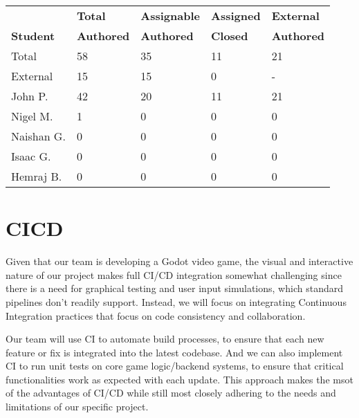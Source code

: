 \documentclass{article}
\begin{document}
\begin{table}[H]
\centering
\begin{tabular}{lllll}
\toprule
\textbf{ } & \textbf{Total} & \textbf{Assignable} & \textbf{Assigned} & \textbf{External}\\
\textbf{Student} & \textbf{Authored} & \textbf{Authored} & \textbf{Closed} & \textbf{Authored}\\
\midrule
Total & 58 & 35 & 11 & 21 \\
\midrule
External & 15 & 15 & 0 & - \\
John P. & 42 & 20 & 11 & 21 \\
Nigel M. & 1 & 0 & 0 & 0 \\
Naishan G. & 0 & 0 & 0 & 0 \\
Isaac G. & 0 & 0 & 0 & 0 \\
Hemraj B. & 0 & 0 & 0 & 0 \\
\bottomrule
\end{tabular}
\end{table}





\section{CICD}

Given that our team is developing a Godot video game, the visual and interactive nature of our project makes full CI/CD integration somewhat challenging since there is a need for graphical testing and user input simulations, which standard pipelines don’t readily support. Instead, we will focus on integrating Continuous Integration practices that focus on code consistency and collaboration.

Our team will use CI to automate build processes, to ensure that each new feature or fix is integrated into the latest codebase. And we can also implement CI to run unit tests on core game logic/backend systems, to ensure that critical functionalities work as expected with each update. This approach makes the msot of the advantages of CI/CD while still most closely adhering to the needs and limitations of our specific project.
\end{document}
